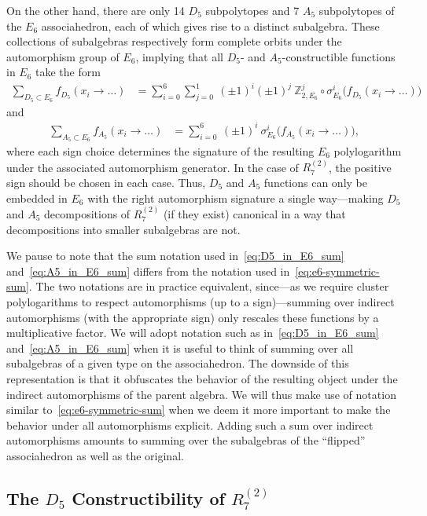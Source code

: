 \documentclass[12pt]{article}
\def\pdfeq#1{\texorpdfstring{$#1$}{a}}
\begin{document}
On the other hand, there are only 14 $D_5$ subpolytopes and 7 $A_5$ subpolytopes of the $E_6$ associahedron, each of which gives rise to a distinct subalgebra. These collections of subalgebras respectively form complete orbits under the automorphism group of $E_6$, implying that all $D_5$- and $A_5$-constructible functions in $E_6$ take the form 
\begin{align}
\sum_{D_5\subset E_6} f_{D_5}(x_i \to \ldots) &= \sum_{i=0}^6\sum_{j=0}^1 \ (\pm1)^i (\pm1)^j \ \mathbb{Z}_{2,E_6}^j \circ \sigma_{E_6}^i \Big(f_{D_5}(x_i \to \ldots) \Big) \label{eq:D5_in_E6_sum} 
\end{align}
and
\begin{align}
\sum_{A_5\subset E_6} f_{A_5}(x_i \to \ldots) &= \sum_{i=0}^6 \ (\pm1)^i \ \sigma_{E_6}^i \Big(f_{A_5}(x_i \to \ldots) \Big), \label{eq:A5_in_E6_sum} \end{align}
where each sign choice determines the signature of the resulting $E_6$ polylogarithm under the associated automorphism generator. In the case of $R_7^{(2)}$\!, the positive sign should be chosen in each case. Thus, $D_5$ and $A_5$ functions can only be embedded in $E_6$ with the right automorphism signature a single way---making $D_5$ and $A_5$ decompositions of $R_7^{(2)}$ (if they exist) canonical in a way that decompositions into smaller subalgebras are not. 

We pause to note that the sum notation used in~\eqref{eq:D5_in_E6_sum} and~\eqref{eq:A5_in_E6_sum} differs from the notation used in~\eqref{eq:e6-symmetric-sum}. The two notations are in practice equivalent, since---as we require cluster polylogarithms to respect automorphisms (up to a sign)---summing over indirect automorphisms (with the appropriate sign) only rescales these functions by a multiplicative factor. We will adopt notation such as in~\eqref{eq:D5_in_E6_sum} and~\eqref{eq:A5_in_E6_sum} when it is useful to think of summing over all subalgebras of a given type on the associahedron. The downside of this representation is that it obfuscates the behavior of the resulting object under the indirect automorphisms of the parent algebra. We will thus make use of notation similar to~\eqref{eq:e6-symmetric-sum} when we deem it more important to make the behavior under all automorphisms explicit. Adding such a sum over indirect automorphisms amounts to summing over the subalgebras of the ``flipped'' associahedron as well as the original.

\subsection{The \pdfeq{D_5} Constructibility of \pdfeq{R^{(2)}_7}}\label{sec:d5-func}
\end{document}
